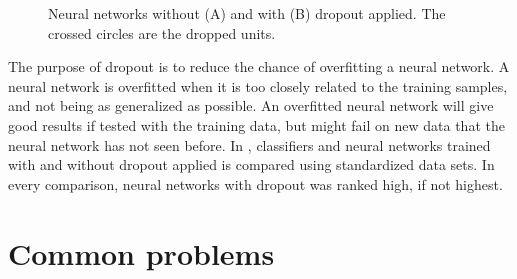 \begin{figure}[H]
\begin{subfigure}{1\textwidth}
    \caption{}
    \label{fig:net_with_dropout}
    \end{subfigure}
\caption{Neural networks without (A) and with (B) dropout applied. The crossed circles are the dropped units.}
\label{fig:dropout_comparison}
\end{figure}

The purpose of dropout is to reduce the chance of overfitting a neural network. A neural network is overfitted when it is too closely related to the training samples, and not being as generalized as possible. An overfitted neural network will give good results if tested with the training data, but might fail on new data that the neural network has not seen before. In \cite{srivastava_dropout:_2014}, classifiers and neural networks trained with and without dropout applied is compared using standardized data sets. In every comparison, neural networks with dropout was ranked high, if not highest.


\section{Common problems}

